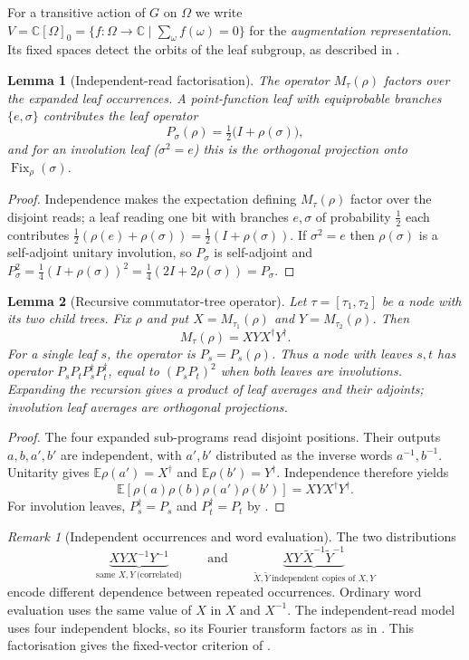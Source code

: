 \documentclass[11pt]{amsart}
\newtheorem{lemma}[lemma]{Lemma}
\theoremstyle{definition}
\theoremstyle{remark}
\newtheorem{remark}[remark]{Remark}
\theoremstyle{plain}
\theoremstyle{plain}
\numberwithin{equation}{section}
\DeclareMathOperator{\Fix}{Fix}
\newcommand{\C}{\mathbb{C}}
\begin{document}
For a transitive action of $G$ on $\Omega$ we write
$V=\C[\Omega]_0=\{f:\Omega\to\C\mid\sum_\omega f(\omega)=0\}$ for the \emph{augmentation
representation}. Its fixed spaces detect the orbits of the leaf subgroup,
as described in .

\begin{lemma}[Independent-read factorisation]
\label{lem:factor}
The operator $M_\tau(\rho)$ factors over the expanded leaf occurrences.
A point-function leaf with equiprobable branches $\{e,\sigma\}$ contributes the
\emph{leaf operator}
\[
P_\sigma(\rho)=\tfrac12\bigl(I+\rho(\sigma)\bigr),
\]
and for an involution leaf ($\sigma^2=e$) this is the \emph{orthogonal projection} onto
$\Fix_\rho(\sigma)$.
\end{lemma}
\begin{proof}
Independence makes the expectation defining $M_\tau(\rho)$ factor over the disjoint reads;
a leaf reading one bit with branches $e,\sigma$ of probability $\tfrac12$ each contributes
$\tfrac12(\rho(e)+\rho(\sigma))=\tfrac12(I+\rho(\sigma))$. If $\sigma^2=e$ then $\rho(\sigma)$ is a
self-adjoint unitary involution, so $P_\sigma$ is self-adjoint and
$P_\sigma^2=\tfrac14(I+\rho(\sigma))^2=\tfrac14(2I+2\rho(\sigma))=P_\sigma$.
\end{proof}

\begin{lemma}[Recursive commutator-tree operator]
\label{lem:tree}
Let $\tau=[\tau_1,\tau_2]$ be a node with its two child trees. Fix $\rho$
and put $X=M_{\tau_1}(\rho)$ and $Y=M_{\tau_2}(\rho)$. Then
\[
 M_\tau(\rho)=XYX^\dagger Y^\dagger.
\]
For a single leaf $s$, the operator is $P_s=P_s(\rho)$. Thus a node
with leaves $s,t$ has operator $P_sP_tP_s^\dagger P_t^\dagger$, equal
to $(P_sP_t)^2$ when both leaves are involutions.
Expanding the recursion gives a product of leaf averages and their
adjoints; involution leaf averages are orthogonal projections.
\end{lemma}
\begin{proof}
The four expanded sub-programs read disjoint positions. Their outputs
$a,b,a',b'$ are independent, with $a',b'$ distributed as the inverse
words $a^{-1},b^{-1}$. Unitarity gives
$\mathbb E\rho(a')=X^\dagger$ and $\mathbb E\rho(b')=Y^\dagger$.
Independence therefore yields
\[
 \mathbb E[\rho(a)\rho(b)\rho(a')\rho(b')]=XYX^\dagger Y^\dagger.
\]
For involution leaves, $P_s^\dagger=P_s$ and $P_t^\dagger=P_t$
by .
\end{proof}

\begin{remark}[Independent occurrences and word evaluation]
\label{rem:notxy}
The two distributions
\[
\underbrace{XYX^{-1}Y^{-1}}_{\text{same }X,Y\ \text{(correlated)}}
\qquad\text{and}\qquad
\underbrace{XY\,\tilde X^{-1}\tilde Y^{-1}}_{\tilde X,\tilde Y\ \text{independent copies of }X,Y}
\]
encode different dependence between repeated occurrences. Ordinary word
evaluation uses the same value of $X$ in $X$ and $X^{-1}$. The
independent-read model uses four independent blocks, so its Fourier
transform factors as in . This factorisation gives the
fixed-vector criterion of .
\end{remark}
\end{document}
